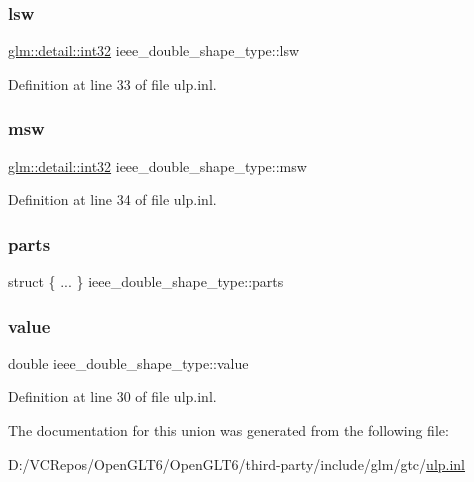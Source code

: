 \subsubsection{\texorpdfstring{lsw}{lsw}}
{\footnotesize\ttfamily \mbox{\hyperlink{namespaceglm_1_1detail_a9f85b4efeca416cdcec2fd08939a2e17}{glm\+::detail\+::int32}} ieee\+\_\+double\+\_\+shape\+\_\+type\+::lsw}



Definition at line 33 of file ulp.\+inl.

\mbox{\label{unionieee__double__shape__type_aea1156759f6afd58a56a7b4e7bfcee01}} 
\subsubsection{\texorpdfstring{msw}{msw}}
{\footnotesize\ttfamily \mbox{\hyperlink{namespaceglm_1_1detail_a9f85b4efeca416cdcec2fd08939a2e17}{glm\+::detail\+::int32}} ieee\+\_\+double\+\_\+shape\+\_\+type\+::msw}



Definition at line 34 of file ulp.\+inl.

\mbox{\label{unionieee__double__shape__type_af07d7842d3604ba30304c8a17bdfa3ff}} 
\subsubsection{\texorpdfstring{parts}{parts}}
{\footnotesize\ttfamily struct \{ ... \}   ieee\+\_\+double\+\_\+shape\+\_\+type\+::parts}

\mbox{\label{unionieee__double__shape__type_a2d9c4cab9e3fa74e4be6d72f798a145b}} 
\subsubsection{\texorpdfstring{value}{value}}
{\footnotesize\ttfamily double ieee\+\_\+double\+\_\+shape\+\_\+type\+::value}



Definition at line 30 of file ulp.\+inl.



The documentation for this union was generated from the following file\+:\begin{DoxyCompactItemize}
\item 
D\+:/\+V\+C\+Repos/\+Open\+G\+L\+T6/\+Open\+G\+L\+T6/third-\/party/include/glm/gtc/\mbox{\hyperlink{ulp_8inl}{ulp.\+inl}}\end{DoxyCompactItemize}
